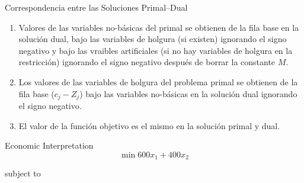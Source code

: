 \begin{frame}{Correspondencia entre las Soluciones Primal--Dual}

  \begin{enumerate} \justifying \parskip3mm
  \item Valores de las variables no-básicas del primal se obtienen de la fila base en la solución dual, bajo las variables de holgura (si existen) ignorando el signo negativo y bajo las vraibles artificiales (si no hay variables de holgura en la restricción) ignorando el signo negativo después de borrar la constante $M$.
  \item Los valores de las variables de holgura del problema primal se obtienen de la fila base ($c_j - Z_j$) bajo las variables no-básicas en la solución dual ignorando el signo negativo.
  \item El valor de la función objetivo es el mismo en la solución primal y dual.
  \end{enumerate}
\end{frame}


\begin{frame}{Economic Interpretation}{}
  \[\min 600x_1 + 400x_2\]

  {\centering
    subject to

    \vspace{3mm}

    

  \par}
  
\end{frame}

